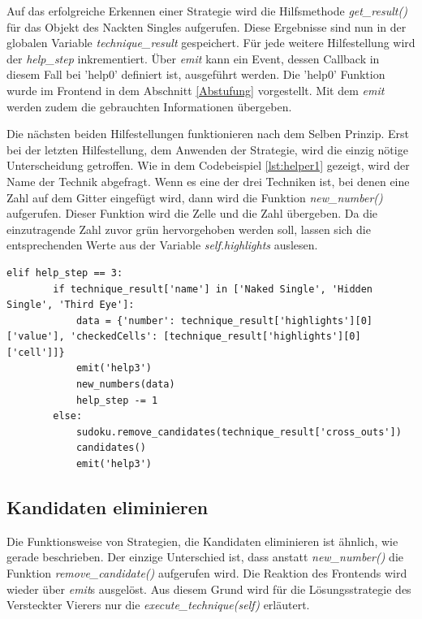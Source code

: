 Auf das erfolgreiche Erkennen einer Strategie wird die Hilfsmethode \textit{get\_result()} für das Objekt des Nackten Singles aufgerufen. Diese Ergebnisse sind nun in der globalen Variable \textit{technique\_result} gespeichert. Für jede weitere Hilfestellung wird der \textit{help\_step} inkrementiert. Über \textit{emit} kann ein Event, dessen Callback in diesem Fall bei 'help0' definiert ist, ausgeführt werden. Die 'help0' Funktion wurde im Frontend in dem Abschnitt \ref{Abstufung} vorgestellt. Mit dem \textit{emit} werden zudem die gebrauchten Informationen übergeben.

Die nächsten beiden Hilfestellungen funktionieren nach dem Selben Prinzip. Erst bei der letzten Hilfestellung, dem Anwenden der Strategie, wird die einzig nötige Unterscheidung getroffen. Wie in dem Codebeispiel \ref{lst:helper1} gezeigt, wird der Name der Technik abgefragt. Wenn es eine der drei Techniken ist, bei denen eine Zahl auf dem Gitter eingefügt wird, dann wird die Funktion \textit{new\_number()} aufgerufen. Dieser Funktion wird die Zelle und die Zahl übergeben. Da die einzutragende Zahl zuvor grün hervorgehoben werden soll, lassen sich die entsprechenden  Werte aus der Variable \textit{self.highlights} auslesen.

\begin{lstlisting}[caption={Serverseitige Unterscheidung der Auswirkung von Strategien}, label={lst:helper1}]
	elif help_step == 3:
		if technique_result['name'] in ['Naked Single', 'Hidden Single', 'Third Eye']:
			data = {'number': technique_result['highlights'][0]['value'], 'checkedCells': [technique_result['highlights'][0]['cell']]}
			emit('help3')
			new_numbers(data)
			help_step -= 1
		else:
			sudoku.remove_candidates(technique_result['cross_outs'])
			candidates()
			emit('help3')
\end{lstlisting}


\subsection{Kandidaten eliminieren}

Die Funktionsweise von Strategien, die Kandidaten eliminieren ist ähnlich, wie gerade beschrieben. Der einzige Unterschied ist, dass anstatt \textit{new\_number()} die Funktion \textit{remove\_candidate()} aufgerufen wird. Die Reaktion des Frontends wird wieder über \textit{emit}s ausgelöst. Aus diesem Grund wird für die Lösungsstrategie des Versteckter Vierers nur die \textit{execute\_technique(self)} erläutert. 

